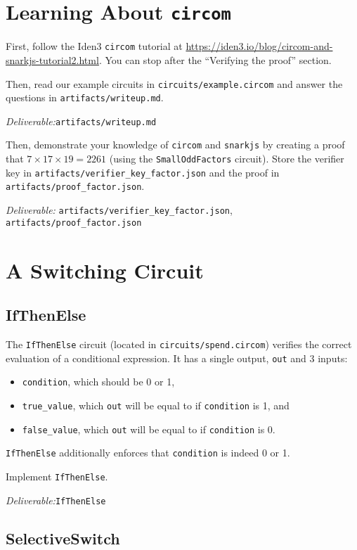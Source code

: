 \documentclass[12pt]{article}
\newcommand{\deliverable}[1]{\begin{tcolorbox}[colback=Gold!8]
\emph{Deliverable:}\xspace #1

\end{tcolorbox}}
\begin{document}
\section{Learning About \texttt{circom}}

First, follow the Iden3 \texttt{circom} tutorial at
\url{https://iden3.io/blog/circom-and-snarkjs-tutorial2.html}. You can stop
after the ``Verifying the proof'' section.

Then, read our example circuits in \texttt{circuits/example.circom} and answer
the questions in \texttt{artifacts/writeup.md}.

\deliverable{\texttt{artifacts/writeup.md}}

Then, demonstrate your knowledge of \texttt{circom} and \texttt{snarkjs} by
creating a proof that $7 \times 17 \times 19 = 2261$ (using the
\texttt{SmallOddFactors} circuit). Store the verifier key in
\texttt{artifacts/verifier\_key\_factor.json} and the proof in
\texttt{artifacts/proof\_factor.json}.
\deliverable{%
\texttt{artifacts/verifier\_key\_factor.json},
\texttt{artifacts/proof\_factor.json}
}


\section{A Switching Circuit}

\subsection{IfThenElse}

The \texttt{IfThenElse} circuit (located in \texttt{circuits/spend.circom})
verifies the correct evaluation of a conditional expression.
It has a single
output, \texttt{out} and 3 inputs:
\begin{itemize}
  \item \texttt{condition}, which should be 0 or 1,
  \item \texttt{true\_value}, which \texttt{out} will be equal to if
    \texttt{condition} is 1, and
  \item \texttt{false\_value}, which \texttt{out} will be equal to if
    \texttt{condition} is 0.
\end{itemize}

\texttt{IfThenElse} additionally enforces that \texttt{condition} is indeed 0 or
1.

Implement \texttt{IfThenElse}.
\deliverable{\texttt{IfThenElse}}

\subsection{SelectiveSwitch}
\end{document}
